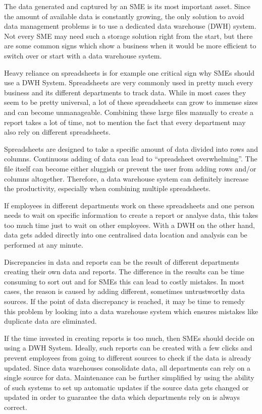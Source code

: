\documentclass[../paper.tex]{subfiles}
\begin{document}
The data generated and captured by an SME is its most important asset. Since
the amount of available data is constantly growing, the only solution to avoid
data management problems is to use a dedicated data warehouse (DWH) system. Not
every SME may need such a storage solution right from the start, but there are
some common signs which show a business when it would be more efficient to
switch over or start with a data warehouse system.

Heavy reliance on spreadsheets is for example one critical sign why SMEs should
use a DWH System. Spreadsheets are very commonly used in pretty much every
business and its different departments to track data. While in most cases they
seem to be pretty universal, a lot of these spreadsheets can grow to immense
sizes and can become unmanageable. Combining these large files manually to
create a report takes a lot of time, not to mention the fact that every
department may also rely on different spreadsheets.

Spreadsheets are designed to take a specific amount of data divided into rows
and columns. Continuous adding of data can lead to “spreadsheet overwhelming”.
The file itself can become either sluggish or prevent the user from adding rows
and/or columns altogether. Therefore, a data warehouse system can definitely
increase the productivity, especially when combining multiple spreadsheets.

If employees in different departments work on these spreadsheets and one person
needs to wait on specific information to create a report or analyse data, this
takes too much time just to wait on other employees. With a DWH on the other
hand, data gets added directly into one centralised data location and analysis
can be performed at any minute.

Discrepancies in data and reports can be the result of different departments
creating their own data and reports. The difference in the results can be time
consuming to sort out and for SMEs this can lead to costly mistakes. In most
cases, the reason is caused by adding different, sometimes untrustworthy data
sources. If the point of data discrepancy is reached, it may be time to remedy
this problem by looking into a data warehouse system which ensures mistakes
like duplicate data are eliminated.

If the time invested in creating reports is too much, then SMEs should decide
on using a DWH System. Ideally, such reports can be created with a few clicks
and prevent employees from going to different sources to check if the data is
already updated. Since data warehouses consolidate data, all departments can
rely on a single source for data. Maintenance can be further simplified by
using the ability of such systems to set up automatic updates if the source
data gets changed or updated in order to guarantee the data which departments
rely on is always correct.
\end{document}
